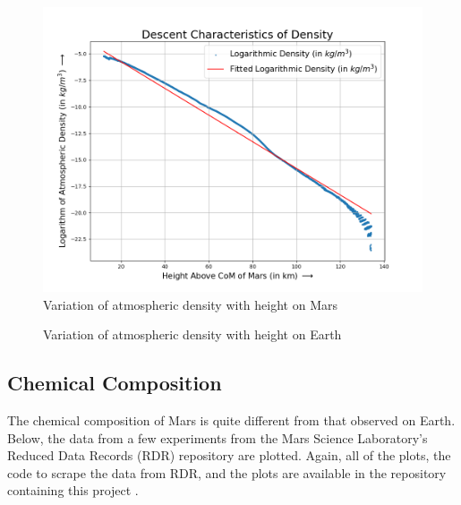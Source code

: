 \begin{figure}[H]
  \includegraphics[scale=0.4]{Pictures/Chapter_7_Future/Log_Density_Plot.png}
  \centering
  \caption{Variation of atmospheric density with height on Mars}
  \label{gra:dens}
\end{figure}

\begin{figure}[H]
	\centering
    
    \caption{Variation of atmospheric density with height on Earth}
	\label{gra:dens_e}
\end{figure}

\subsection{Chemical Composition}

The chemical composition of Mars is quite different from that observed on Earth. Below, the data from a few experiments from the Mars Science Laboratory's Reduced Data Records (RDR) repository \cite{rdr2013mars} are plotted. Again, all of the plots, the code to scrape the data from RDR, and the plots are available in the repository containing this project \cite{Raghuveeran_Work_During_Summer_2024}.

